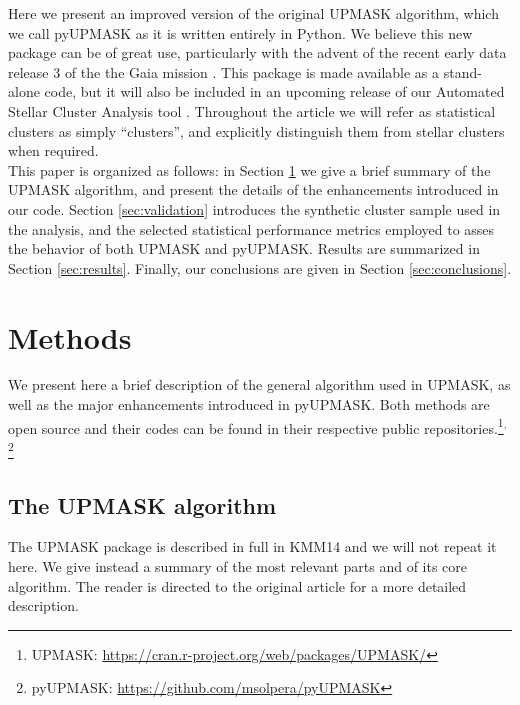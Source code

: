 \documentclass{aa}
\begin{document}
 Here we present an improved version of the original UPMASK algorithm, which we
 call pyUPMASK as it is written entirely in Python. We believe this new package
 can be of great use, particularly with the advent of the recent early data
 release 3 \citep[eDR3,][]{GaiaEDR3_2020} of the the Gaia
 mission \citep{Gaia_2016}.
 This package is made available as a stand-alone code, but it will also be
 included in an upcoming release of our Automated Stellar Cluster Analysis
 tool \citep[\texttt{ASteCA},][]{Perren_2015}.
 Throughout the article we will refer as statistical clusters as simply
 ``clusters'', and explicitly distinguish them from stellar clusters when
 required.\\

 This paper is organized as follows: in Section \ref{sec:methods} we
 give a brief summary of the UPMASK algorithm, and present the details of the
 enhancements introduced in our code. 
 Section \ref{sec:validation} introduces the synthetic cluster sample
 used in the analysis, and the selected statistical performance metrics
 employed to asses the behavior of both UPMASK and pyUPMASK.
 Results are summarized in Section \ref{sec:results}. Finally, our
 conclusions are given in Section \ref{sec:conclusions}.



\section{Methods}
 \label{sec:methods}

 We present here a brief description of the general algorithm used in UPMASK,
 as well as the major enhancements introduced in pyUPMASK.
 Both methods are open source and their codes can be found in their
 respective public repositories.\footnote{UPMASK: 
 \url{https://cran.r-project.org/web/packages/UPMASK/}}$^{,}$\footnote{pyUPMASK:
 \url{https://github.com/msolpera/pyUPMASK}} %



\subsection{The UPMASK algorithm}
 \label{ssec:upmask}

 The UPMASK package is described in full in KMM14 and we will not repeat it
 here. We give instead a summary of the most relevant parts and of its core
 algorithm. The reader is directed to the original article for a more detailed
 description.\\
 
\end{document}
